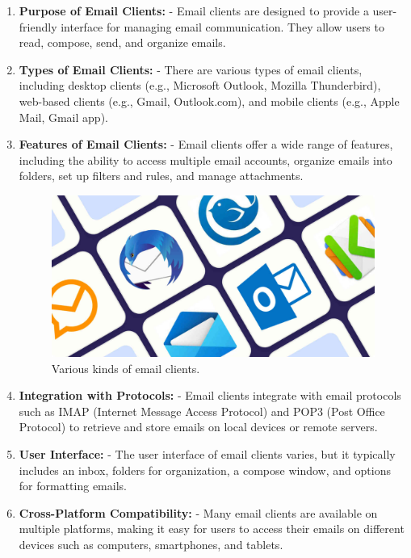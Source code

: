\documentclass[11pt]{article}
\begin{document}
\begin{enumerate}
    \item \textbf{Purpose of Email Clients:}
          - Email clients are designed to provide a user-friendly interface for managing email communication. They allow users to read, compose, send, and organize emails.

    \item \textbf{Types of Email Clients:}
          - There are various types of email clients, including desktop clients (e.g., Microsoft Outlook, Mozilla Thunderbird), web-based clients (e.g., Gmail, Outlook.com), and mobile clients (e.g., Apple Mail, Gmail app).

    \item \textbf{Features of Email Clients:}
          - Email clients offer a wide range of features, including the ability to access multiple email accounts, organize emails into folders, set up filters and rules, and manage attachments.

          \begin{figure}[H]
              \centering
              \includegraphics[width=.85\textwidth]{./emailclients/email clients_0.jpg}
              \caption{Various kinds of email clients. }
          \end{figure}

    \item \textbf{Integration with Protocols:}
          - Email clients integrate with email protocols such as IMAP (Internet Message Access Protocol) and POP3 (Post Office Protocol) to retrieve and store emails on local devices or remote servers.

    \item \textbf{User Interface:}
          - The user interface of email clients varies, but it typically includes an inbox, folders for organization, a compose window, and options for formatting emails.

    \item \textbf{Cross-Platform Compatibility:}
          - Many email clients are available on multiple platforms, making it easy for users to access their emails on different devices such as computers, smartphones, and tablets.


\end{enumerate}
\end{document}
